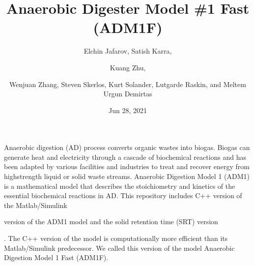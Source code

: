 \documentclass[a4paper,10pt,english]{sphinxmanual}
\title{Anaerobic Digester Model \#1 Fast (ADM1F)}
\date{Jun 28, 2021}
\author{Elchin Jafarov, Satish Karra,\and Kuang Zhu,\and Wenjuan Zhang, Steven Skerlos, Kurt Solander, Lutgarde Raskin, and Meltem Urgun Demirtas}
\let\sphinxpxdimen\pdfpxdimen\else\newdimen\sphinxpxdimen
\begin{document}
\pagestyle{empty}
\sphinxmaketitle
\pagestyle{plain}
\sphinxtableofcontents
\pagestyle{normal}
\label{\detokenize{index::doc}}


\sphinxAtStartPar
Anaerobic digestion (AD) process converts organic wastes into biogas. Biogas can generate heat and electricity through a cascade of biochemical reactions and has been adapted by various facilities and industries to treat and recover energy from high\sphinxhyphen{}strength liquid or solid waste streams. Anaerobic Digestion Model 1 (ADM1) is a mathematical model that describes the stoichiometry and kinetics of the essential biochemical reactions in AD. This repository includes C++ version of the Matlab/Simulink %
\begin{footnote}[1]\sphinxAtStartFootnote
{}
%
\end{footnote} version of the ADM1 model and the solid retention time (SRT) version %
\begin{footnote}[2]\sphinxAtStartFootnote
{}
%
\end{footnote}. The C++ version of the model is computationally more efficient than its Matlab/Simulink predecessor. We called this version of the model Anaerobic Digestion Model 1 Fast (ADM1F).

\noindent\sphinxincludegraphics[width=1216\sphinxpxdimen,height=685\sphinxpxdimen]{{digester_m}.png}
\end{document}
